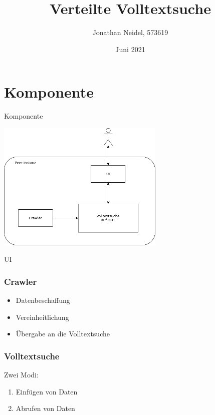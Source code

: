 \documentclass{beamer}
\title{Verteilte Volltextsuche}
\subtitle{}
\author{Jonathan Neidel, 573619}
\date{Juni 2021}
\institute{HTW Berlin, Angewandte Informatik, Projektarbeit bei Herr Hoppe}
\begin{document}
\frame{\titlepage}

\section{Komponente}
\begin{frame}
  \begin{center}
    {\Huge Komponente}
  \end{center}
\end{frame}

\begin{frame}
  \begin{center}
    \includegraphics[width=8cm]{Komponente-einzeln}
  \end{center}
\end{frame}

\begin{frame}
  \begin{center}
    {\Huge UI}
  \end{center}
\end{frame}

\begin{frame}
  \frametitle{Crawler}

  \begin{itemize}
    \item Datenbeschaffung
    \item Vereinheitlichung
    \item Übergabe an die Volltextsuche
  \end{itemize}
\end{frame}

\begin{frame}
  \frametitle{Volltextsuche}

  Zwei Modi:
  \begin{enumerate}
    \item Einfügen von Daten
    \item Abrufen von Daten
  \end{enumerate}
\end{frame}
\end{document}
